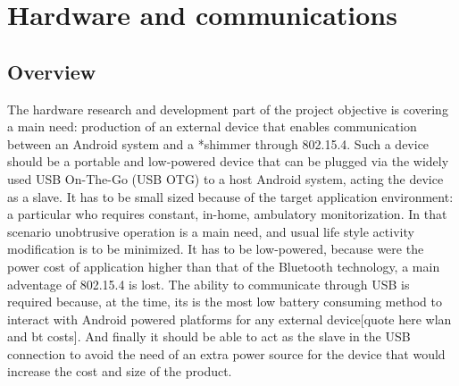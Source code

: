 \chapter{Hardware and communications}
\label{ch:hardware}
	\section{Overview}	





	The hardware research and development part of the project objective is covering a main need: production of an external device that enables communication between an Android system and a *shimmer through 802.15.4. Such a device should be a portable and low-powered device that can be plugged via the widely used USB On-The-Go (USB OTG) to a host Android system, acting the device as a slave. It has to be small sized because of the target application environment: a particular who requires constant, in-home, ambulatory monitorization. 
	In that scenario unobtrusive operation is a main need, and usual life style activity modification is to be minimized.
 It has to be low-powered, because were the power cost of application higher than that of the Bluetooth technology, a main adventage of 802.15.4 is lost. The ability to communicate through USB is required because, at the time, its is the most low battery consuming method to interact with Android powered platforms for any external device[quote here wlan and bt costs]. And finally it should be able to act as the slave in the USB connection to avoid the need of an extra power source for the device that would increase the cost and size of the product.\\

